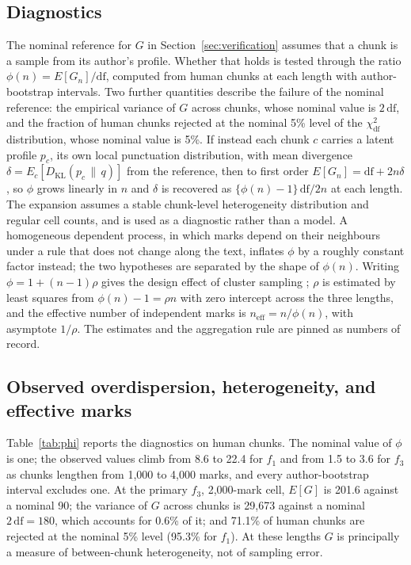 \documentclass[11pt]{article}
\newcommand{\fOne}{\ensuremath{f_1}\xspace}
\newcommand{\fThree}{\ensuremath{f_3}\xspace}
\newcommand{\KL}{D_{\mathrm{KL}}}
\begin{document}
\subsection{Diagnostics}
\label{sec:overdispersion}

The nominal reference for \(G\) in Section~\ref{sec:verification} assumes
that a chunk is a sample from its author's profile.  Whether that holds is
tested through the ratio \(\phi(n) = E[G_n]/\mathrm{df}\), computed from
human chunks at each length with author-bootstrap intervals.
Two further quantities describe the failure of the nominal
reference: the empirical variance of \(G\) across chunks, whose nominal
value is \(2\,\mathrm{df}\), and the fraction of human chunks rejected at
the nominal 5\% level of the \(\chi^2_{\mathrm{df}}\) distribution, whose
nominal value is 5\%.  If instead each chunk \(c\) carries a latent
profile \(p_c\), its own local punctuation distribution, with mean
divergence \(\delta = E_c[\KL(p_c \,\|\, q)]\) from the reference,
then to first order \(E[G_n] = \mathrm{df} + 2n\delta\), so \(\phi\) grows
linearly in \(n\) and \(\delta\) is recovered as
\(\{\phi(n) - 1\}\,\mathrm{df}/2n\) at each length.  The expansion assumes
a stable chunk-level heterogeneity distribution and regular cell counts,
and is used as a diagnostic rather than a model.  A homogeneous
dependent process, in which marks depend on their neighbours under a rule
that does not change along the text, inflates \(\phi\) by a roughly
constant factor instead; the two hypotheses are separated by the shape of
\(\phi(n)\).
Writing \(\phi = 1 + (n-1)\rho\) gives the design effect of cluster
sampling \cite{kish1965}; \(\rho\) is estimated by least squares from
\(\phi(n) - 1 = \rho n\) with zero intercept across the three lengths, and
the effective number of independent marks is
\(n_{\mathrm{eff}} = n/\phi(n)\), with asymptote \(1/\rho\).  The estimates
and the aggregation rule are pinned as numbers of record.

\subsection{Observed overdispersion, heterogeneity, and effective marks}
\label{sec:observed-phi}

Table~\ref{tab:phi} reports the diagnostics on human chunks.  The nominal
value of \(\phi\) is one; the observed values climb from 8.6 to 22.4 for
\fOne and from 1.5 to 3.6 for \fThree as chunks lengthen from 1,000 to
4,000 marks, and every author-bootstrap interval excludes one.  At the
primary \fThree, 2,000-mark cell, \(E[G]\) is 201.6 against a nominal 90;
the variance of \(G\) across chunks is 29,673 against a nominal
\(2\,\mathrm{df} = 180\), which accounts for 0.6\% of it; and 71.1\% of
human chunks are rejected at the nominal 5\% level (95.3\% for \fOne).
At these lengths \(G\) is principally a measure of between-chunk
heterogeneity, not of sampling error.
\end{document}
